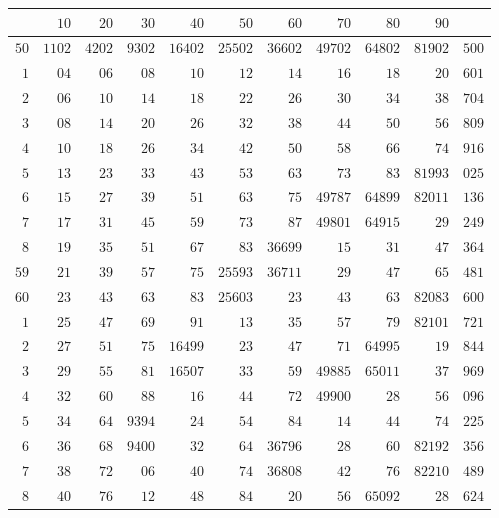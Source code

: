 \clearpage{}
\begingroup\fontsize{8.5}{10}\selectfont\setlength{\tabcolsep}{2pt}\renewcommand{\arraystretch}{1}
\begin{longtable}{@{}r|r|r|r|r|r|r|r|r|r|r@{}}
\hline
 & $10$ & $20$ & $30$ & $40$ & $50$ & $60$ & $70$ & $80$ & $90$ & \\
\hline\endhead
$50$ & $1102$ & $4202$ & $9302$ & $16402$ & $25502$ & $36602$ & $49702$ & $64802$ & $81902$ & $500$\\
$1$ & $04$ & $06$ & $08$ & $10$ & $12$ & $14$ & $16$ & $18$ & $20$ & $601$\\
$2$ & $06$ & $10$ & $14$ & $18$ & $22$ & $26$ & $30$ & $34$ & $38$ & $704$\\
$3$ & $08$ & $14$ & $20$ & $26$ & $32$ & $38$ & $44$ & $50$ & $56$ & $809$\\
$4$ & $10$ & $18$ & $26$ & $34$ & $42$ & $50$ & $58$ & $66$ & $74$ & $916$\\
$5$ & $13$ & $23$ & $33$ & $43$ & $53$ & $63$ & $73$ & $83$ & $81993$ & $025$\\
$6$ & $15$ & $27$ & $39$ & $51$ & $63$ & $75$ & $49787$ & $64899$ & $82011$ & $136$\\
$7$ & $17$ & $31$ & $45$ & $59$ & $73$ & $87$ & $49801$ & $64915$ & $29$ & $249$\\
$8$ & $19$ & $35$ & $51$ & $67$ & $83$ & $36699$ & $15$ & $31$ & $47$ & $364$\\
$59$ & $21$ & $39$ & $57$ & $75$ & $25593$ & $36711$ & $29$ & $47$ & $65$ & $481$\\
$60$ & $23$ & $43$ & $63$ & $83$ & $25603$ & $23$ & $43$ & $63$ & $82083$ & $600$\\
$1$ & $25$ & $47$ & $69$ & $91$ & $13$ & $35$ & $57$ & $79$ & $82101$ & $721$\\
$2$ & $27$ & $51$ & $75$ & $16499$ & $23$ & $47$ & $71$ & $64995$ & $19$ & $844$\\
$3$ & $29$ & $55$ & $81$ & $16507$ & $33$ & $59$ & $49885$ & $65011$ & $37$ & $969$\\
$4$ & $32$ & $60$ & $88$ & $16$ & $44$ & $72$ & $49900$ & $28$ & $56$ & $096$\\
$5$ & $34$ & $64$ & $9394$ & $24$ & $54$ & $84$ & $14$ & $44$ & $74$ & $225$\\
$6$ & $36$ & $68$ & $9400$ & $32$ & $64$ & $36796$ & $28$ & $60$ & $82192$ & $356$\\
$7$ & $38$ & $72$ & $06$ & $40$ & $74$ & $36808$ & $42$ & $76$ & $82210$ & $489$\\
$8$ & $40$ & $76$ & $12$ & $48$ & $84$ & $20$ & $56$ & $65092$ & $28$ & $624$\\

\end{longtable}
